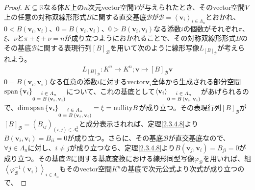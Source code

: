 \documentclass[dvipdfmx]{jsarticle}
\begin{document}
\begin{proof}
$K \subseteq \mathbb{R}$なる体$K$上の$n$次元vector空間$V$が与えられたとき、そのvector空間$V$上の任意の対称双線形形式$B$に関する直交基底$\mathcal{B}$が$\mathcal{B} =\left\langle \mathbf{v}_{i} \right\rangle_{i \in \varLambda_{n}}$とおかれ、$0 < B\left( \mathbf{v}_{i},\mathbf{v}_{i} \right)$、$0 = B\left( \mathbf{v}_{i},\mathbf{v}_{i} \right)$、$0 > B\left( \mathbf{v}_{i},\mathbf{v}_{i} \right)$なる添数$i$の個数がそれぞれ$\pi$、$\xi$、$\nu$と$\pi + \xi + \nu = n$が成り立つようにおかれることで、その対称双線形形式$B$のその基底$\mathcal{B}$に関する表現行列$[ B]_{\mathcal{B}}$を用いて次のように線形写像$L_{[ B]_{\mathcal{B}}}$が考えられよう。
\begin{align*}
L_{[ B]_{\mathcal{B}}}:K^{n} \rightarrow K^{n};\mathbf{v} \mapsto [ B]_{\mathcal{B}}\mathbf{v}
\end{align*}
$0 = B\left( \mathbf{v}_{i},\mathbf{v}_{i} \right)$なる任意の添数$i$に対するvector$\mathbf{v}_{i}$全体から生成される部分空間${\mathrm{span}}\left\{ \mathbf{v}_{i} \right\}_{\scriptsize \begin{matrix} i \in \varLambda_{n} \\0 = B\left( \mathbf{v}_{i},\mathbf{v}_{i} \right) \end{matrix}}$について、これの基底として$\left\langle \mathbf{v}_{i} \right\rangle_{\scriptsize \begin{matrix} i \in \varLambda_{n} \\0 = B\left( \mathbf{v}_{i},\mathbf{v}_{i} \right) \end{matrix}}$があげられるので、$\dim{{\mathrm{span}}\left\{ \mathbf{v}_{i} \right\}_{\scriptsize \begin{matrix} i \in \varLambda_{n} \\0 = B\left( \mathbf{v}_{i},\mathbf{v}_{i} \right) \end{matrix}}} = \xi = {\mathrm{nullity}}B$が成り立つ。その表現行列$[ B]_{\mathcal{B}}$が$[ B]_{\mathcal{B}} = \left( B_{ij} \right)_{(i,j) \in \varLambda_{n}^{2}}$と成分表示されれば、定理\ref{2.3.4.8}より$B\left( \mathbf{v}_{i},\mathbf{v}_{i} \right) = B_{ii} = 0$が成り立つ。さらに、その基底$\mathcal{B}$が直交基底なので、$\forall j \in \varLambda_{n}$に対し、$i \neq j$が成り立つなら、定理\ref{2.3.4.8}より$B\left( \mathbf{v}_{j},\mathbf{v}_{i} \right) = B_{ji} = 0$が成り立つ。その基底$\mathcal{B}$に関する基底変換における線形同型写像$\varphi_{\mathcal{B}}$を用いれば、組$\left\langle \varphi_{\mathcal{B}}^{- 1}\left( \mathbf{v}_{i} \right) \right\rangle_{i \in \varLambda_{n}}$もそのvector空間$K^{n}$の基底で次元公式より次式が成り立つので、

\end{proof}
\end{document}
